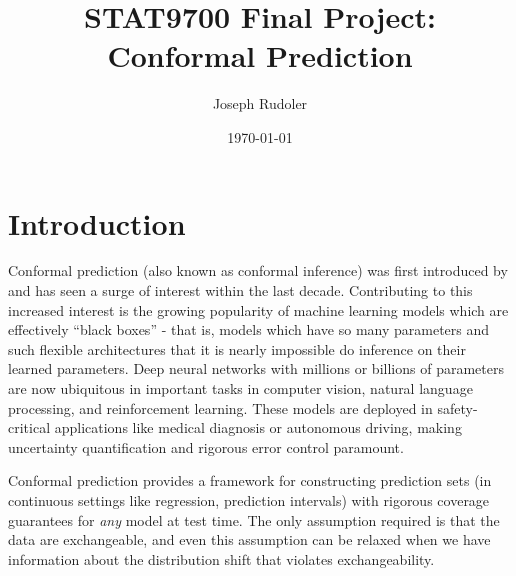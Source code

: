\documentclass[a4paper, 12pt]{article}
\title{STAT9700 Final Project: Conformal Prediction}
\author{Joseph Rudoler}
\date{\today}
\begin{document}
\maketitle

\newpage
\tableofcontents

\newpage
\section{Introduction}
\label{sec:intro}
Conformal prediction (also known as conformal inference) was first introduced by \textcite{vovkMachineLearningApplicationsAlgorithmic1999} and has seen a surge of interest within the last decade. Contributing to this increased interest is the growing popularity of machine learning models which are effectively ``black boxes'' - that is, models which have so many parameters and such flexible architectures that it is nearly impossible do inference on their learned parameters. Deep neural networks with millions or billions of parameters are now ubiquitous in important tasks in computer vision, natural language processing, and reinforcement learning. These models are deployed in safety-critical applications like medical diagnosis or autonomous driving, making uncertainty quantification and rigorous error control paramount.

Conformal prediction provides a framework for constructing prediction sets (in continuous settings like regression, prediction intervals) with rigorous coverage guarantees for \textit{any} model at test time. The only assumption required is that the data are exchangeable, and even this assumption can be relaxed when we have information about the distribution shift that violates exchangeability.
\end{document}
